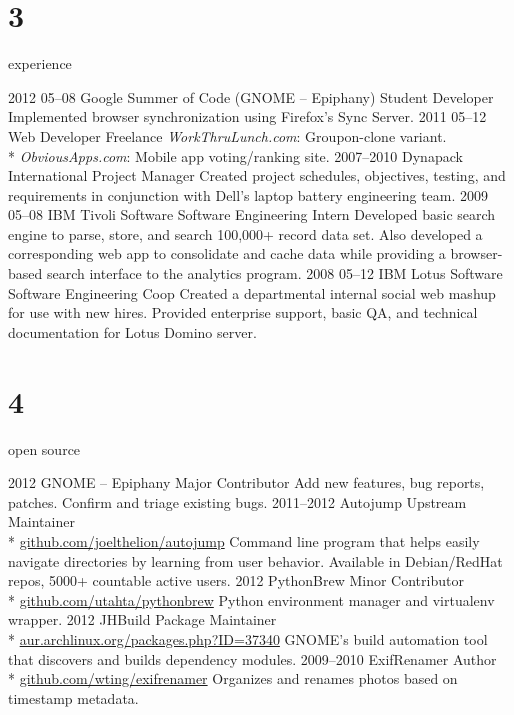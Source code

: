 \documentclass[]{friggeri-cv}
\begin{document}

\section{3}{experience}

\begin{entrylist}
  \entry
  {2012 05–08}
  {Google Summer of Code (GNOME – Epiphany)}
  {Student Developer}
  {Implemented browser synchronization using Firefox's Sync Server.}
  \entry
  {2011 05–12}
  {Web Developer}
  {Freelance}
  {\emph{WorkThruLunch.com}: Groupon-clone variant.
  \\* \emph{ObviousApps.com}: Mobile app voting/ranking site.}
  \entry
  {2007–2010}
  {Dynapack International}
  {Project Manager}
  {Created project schedules, objectives, testing, and requirements in conjunction
  with Dell's laptop battery engineering team.}
  \entry
  {2009 05–08}
  {IBM Tivoli Software}
  {Software Engineering Intern}
  {Developed basic search engine to parse, store, and search 100,000+ record data
  set. Also developed a corresponding web app to consolidate and cache data
  while providing a browser-based search interface to the analytics program.}
  \entry
  {2008 05–12}
  {IBM Lotus Software}
  {Software Engineering Coop}
  {Created a departmental internal social web mashup for use with new hires.
  Provided enterprise support, basic QA, and technical documentation for Lotus
  Domino server.}
\end{entrylist}

\section{4}{open source}

\begin{entrylist}
  \entry
  {2012}
  {GNOME – Epiphany}
  {Major Contributor}
  {Add new features, bug reports, patches. Confirm and triage existing bugs.}
  \entry
  {2011–2012}
  {Autojump}
  {Upstream Maintainer
  \\* \href{https://github.com/joelthelion/autojump}{github.com/joelthelion/autojump}}
  {Command line program that helps easily navigate directories by learning
  from user behavior. Available in Debian/RedHat repos, 5000+ countable active users.}
  \entry
  {2012}
  {PythonBrew}
  {Minor Contributor
  \\* \href{https://github.com/utahta/pythonbrew}{github.com/utahta/pythonbrew}}
  {Python environment manager and virtualenv wrapper.}
  \entry
  {2012}
  {JHBuild}
  {Package Maintainer
  \\* \href{https://aur.archlinux.org/packages.php?ID=37340}{aur.archlinux.org/packages.php?ID=37340}}
  {GNOME's build automation tool that discovers and builds dependency modules.}
  \entry
  {2009–2010}
  {ExifRenamer}
  {Author
  \\* \href{https://github.com/wting/exifrenamer}{github.com/wting/exifrenamer}}
  {Organizes and renames photos based on timestamp metadata.}
\end{entrylist}
\end{document}
